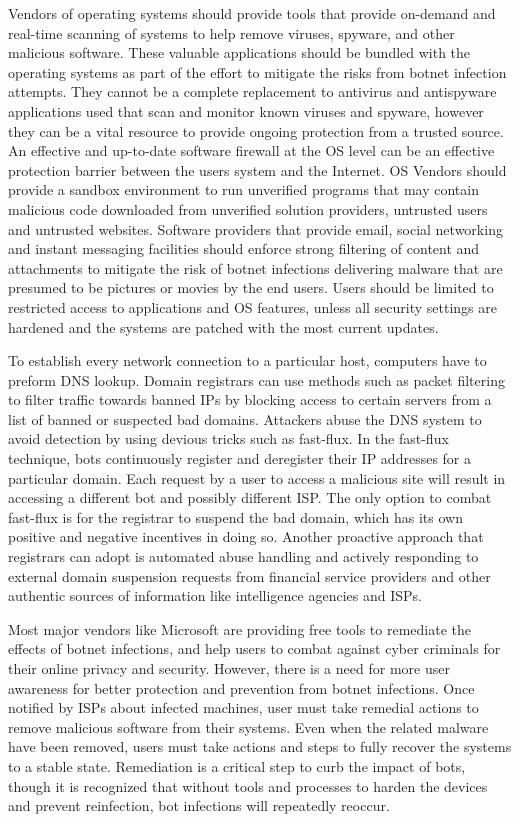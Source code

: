 Vendors of operating systems should provide tools that provide on-demand and real-time scanning of systems to help remove viruses, spyware, and other malicious software. These valuable applications should be bundled with the operating systems as part of the effort to mitigate the risks from botnet infection attempts. They cannot be a complete replacement to antivirus and antispyware applications used that scan and monitor known viruses and spyware, however they can be a vital resource to provide ongoing protection from a trusted source. An effective and up-to-date software firewall at the OS level can be an effective protection barrier between the users system and the Internet. OS Vendors should provide a sandbox environment to run unverified programs that may contain malicious code downloaded from unverified solution providers, untrusted users and untrusted websites. Software providers that provide email, social networking and instant messaging facilities should enforce strong filtering of content and attachments to mitigate the risk of botnet infections delivering malware that are presumed to be pictures or movies by the end users. Users should be limited to restricted access to applications and OS features, unless all security settings are hardened and the systems are patched with the most current updates.	

To establish every network connection to a particular host, computers have to preform DNS lookup. Domain registrars can use methods such as packet filtering to filter traffic towards banned IPs by blocking access to certain servers from a list of banned or suspected bad domains. Attackers abuse the DNS system to avoid detection by using devious tricks such as fast-flux. In the fast-flux technique, bots continuously register and deregister their IP addresses for a particular domain. Each request by a user to access a malicious site will result in accessing a different bot and possibly different ISP. The only option to combat fast-flux is for the registrar to suspend the bad domain, which has its own positive and negative incentives in doing so. Another proactive approach that registrars can adopt is automated abuse handling and actively responding to external domain suspension requests from financial service providers and other authentic sources of information like intelligence agencies and ISPs.

Most major vendors like Microsoft are providing free tools to remediate the effects of botnet infections, and help users to combat against cyber criminals for their online privacy and security. However, there is a need for more user awareness for better protection and prevention from botnet infections. Once notified by ISPs about infected machines, user must take remedial actions to remove malicious software from their systems. Even when the related malware have been removed, users must take actions and steps to fully recover the systems to a stable state. Remediation is a critical step to curb the impact of bots, though it is recognized that without tools and processes to harden the devices and prevent reinfection, bot infections will repeatedly reoccur.

